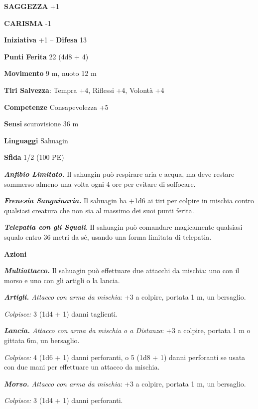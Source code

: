\begin{multicols}{2}
\textbf{SAGGEZZA} +1

\textbf{CARISMA} -1

\textbf{Iniziativa} +1 -- \textbf{Difesa} 13

\textbf{Punti Ferita} 22 (4d8 + 4)

\textbf{Movimento} 9 m, nuoto 12 m

\textbf{Tiri Salvezza}: Tempra +4, Riflessi +4, Volontà +4

\textbf{Competenze} Consapevolezza +5

\textbf{Sensi} scurovisione 36 m

\textbf{Linguaggi} Sahuagin

\textbf{Sfida} 1/2 (100 PE)

\emph{\textbf{Anfibio Limitato.}} Il sahuagin può respirare aria e acqua, ma deve restare sommerso almeno una volta ogni 4 ore per evitare di soffocare.

\emph{\textbf{Frenesia Sanguinaria.}} Il sahuagin ha +1d6 ai tiri per colpire in mischia contro qualsiasi creatura che non sia al massimo dei suoi punti ferita.

\emph{\textbf{Telepatia con gli Squali}}. Il sahuagin può comandare magicamente qualsiasi squalo entro 36 metri da sé, usando una forma limitata di telepatia. 

\textbf{Azioni}

\emph{\textbf{Multiattacco.}} Il sahuagin può effettuare due attacchi da mischia:  uno con il morso e uno con gli artigli o la lancia.

\emph{\textbf{Artigli.} Attacco con arma da mischia}: +3 a colpire, portata 1 m, un bersaglio.

\emph{Colpisce:} 3 (1d4 + 1) danni taglienti.

\emph{\textbf{Lancia.} Attacco con arma da mischia o a Distanza}: +3 a colpire, portata 1 m o gittata 6m, un bersaglio.

\emph{Colpisce:} 4 (1d6 + 1) danni perforanti, o 5 (1d8 + 1) danni perforanti se usata con due mani per effettuare un attacco da mischia.

\emph{\textbf{Morso.} Attacco con arma da mischia}: +3 a colpire, portata 1 m, un bersaglio.

\emph{Colpisce:} 3 (1d4 + 1) danni perforanti.


\end{multicols}
